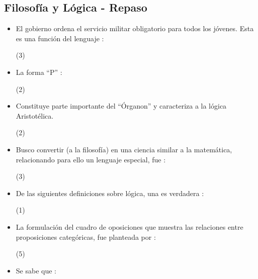 \documentclass[11pt, twocolumn, landscape, a4paper]{article}
\begin{document}
\subsection*{Filosofía y Lógica - Repaso}


\begin{itemize}
\item{El gobierno ordena el servicio militar obligatorio para todos los jóvenes. Esta es una función del lenguaje :
\begin{tasks}(3)
\end{tasks}
}
\item{La forma ``\textrm{P}'' :
\begin{tasks}(2)
\end{tasks}
}
\item{Constituye parte importante del ``Órganon'' y caracteriza a la lógica Aristotélica.
\begin{tasks}(2)
\end{tasks}
}
\item{Busco convertir (a la filosofía) en una ciencia similar a la matemática, relacionando para ello un lenguaje especial, fue :
\begin{tasks}(3)
\end{tasks}
}
\item{De las siguientes definiciones sobre lógica, una es verdadera :
\begin{tasks}(1)
\end{tasks}
}
\item{La formulación del cuadro de oposiciones que muestra las relaciones entre proposiciones categóricas, fue planteada por :
\begin{tasks}(5)
\end{tasks}
}
\item{Se sabe que :
\begin{enumerate}[i.]

\end{enumerate}}
\end{itemize}
\end{document}
